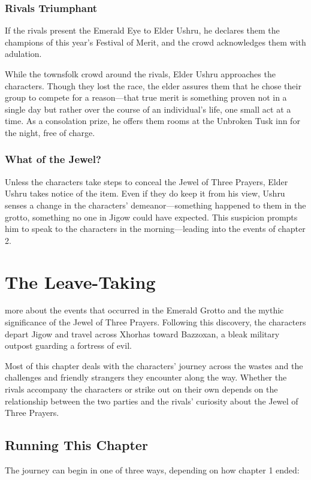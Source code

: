 \documentclass[10pt,a4paper,twoside,bg=print,twocolumn,openany,nodeprecatedcode]{dndbook}
\begin{document}
\subsection{Rivals Triumphant}
If the rivals present the Emerald Eye to Elder Ushru, he declares them the champions of this year's Festival of Merit, and the crowd acknowledges them with adulation.

While the townsfolk crowd around the rivals, Elder Ushru approaches the characters. Though they lost the race, the elder assures them that he chose their group to compete for a reason—that true merit is something proven not in a single day but rather over the course of an individual's life, one small act at a time. As a consolation prize, he offers them rooms at the Unbroken Tusk inn for the night, free of charge.

\subsection{What of the Jewel?}
Unless the characters take steps to conceal the Jewel of Three Prayers, Elder Ushru takes notice of the item. Even if they do keep it from his view, Ushru senses a change in the characters' demeanor—something happened to them in the grotto, something no one in Jigow could have expected. This suspicion prompts him to speak to the characters in the morning—leading into the events of chapter 2.

\chapter{The Leave-Taking}
 more about the events that occurred in the Emerald Grotto and the mythic significance of the Jewel of Three Prayers. Following this discovery, the characters depart Jigow and travel across Xhorhas toward Bazzoxan, a bleak military outpost guarding a fortress of evil.


Most of this chapter deals with the characters' journey across the wastes and the challenges and friendly strangers they encounter along the way. Whether the rivals accompany the characters or strike out on their own depends on the relationship between the two parties and the rivals' curiosity about the Jewel of Three Prayers.

\section{Running This Chapter}
The journey can begin in one of three ways, depending on how chapter 1 ended:
\end{document}

